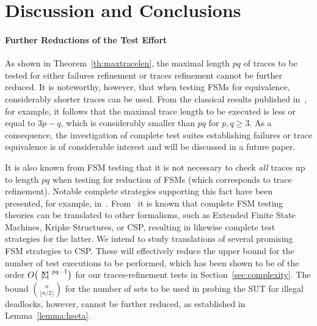 \section{Discussion and Conclusions}
\label{sec:conc}

\paragraph{Further Reductions of the Test Effort} As shown in
Theorem~\ref{th:maxtracelen}, the maximal length $pq$ of traces to be tested
for either  failures refinement or traces refinement cannot be further
reduced. It is noteworthy, however, that when testing FSMs for equivalence,
considerably shorter traces can be used. From the classical results published
in~\cite{chow:wmethod,vasilevskii1973}, for example, it follows that the
maximal trace length to be executed is less or equal to $3p -q$, which is
considerably smaller than $pq$ for $p,q\ge 3$. As a consequence, the
investigation of complete test suites establishing failures or trace
equivalence is of considerable interest and will be discussed in a future
paper.


It is also known from FSM testing that it is not necessary to check {\it all}
traces up to length $pq$ when testing for reduction of FSMs (which
corresponds to trace refinement). Notable complete strategies supporting this
fact have been presented, for example,
in~\cite{hierons_testing_2004,DBLP:conf/forte/DorofeevaEY05,petrenko_testing_2011,simao_reducing_2012}.
From~\cite{Huang2017} it is known that complete FSM testing theories can be
translated to other formalisms, such as Extended Finite State Machines,
Kripke Structures, or CSP, resulting in likewise complete test strategies for
the latter. We intend to study translations of several promising FSM
strategies to CSP. These will effectively reduce the upper bound for the
number of test executions to be performed, which  has been shown to be of the
order $O\big({~|\! \Sigma\!|~}^{pq-1}\big)$ for our traces-refinement tests in
Section~\ref{sec:complexity}.  The bound $\binom{n}{\lfloor n/2\rfloor}$ for
the number of sets to be used in probing the SUT for illegal deadlocks,
however, cannot be further reduced, as established in
Lemma~\ref{lemma:hseta}.

